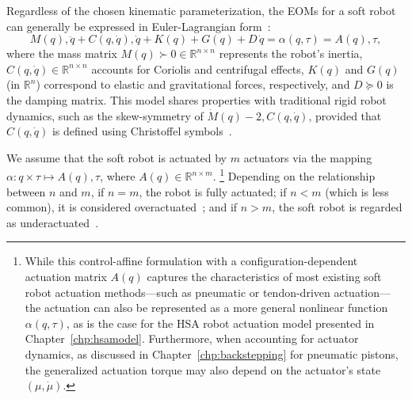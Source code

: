 Regardless of the chosen kinematic parameterization, the \glspl{EOM} for a soft robot can generally be expressed in Euler-Lagrangian form~\citep{della2023model}:
\begin{equation}\label{eq:background:dynamics:eom}
M(q) , \ddot{q} + C(q, \dot{q}) , \dot{q} + K(q) + G(q) + D \, \dot{q} = \alpha(q,\tau) = A(q) , \tau,
\end{equation}
where the mass matrix $M(q) \succ 0 \in \mathbb{R}^{n \times n}$ represents the robot’s inertia, $C(q,\dot{q}) \in \mathbb{R}^{n \times n}$ accounts for Coriolis and centrifugal effects, $K(q)$ and $G(q)$ (in $\mathbb{R}^{n}$) correspond to elastic and gravitational forces, respectively, and $D \succeq 0$ is the damping matrix. This model shares properties with traditional rigid robot dynamics, such as the skew-symmetry of $\dot{M}(q) - 2 , C(q,\dot{q})$, provided that $C(q,\dot{q})$ is defined using Christoffel symbols~\citep{della2020model}.

We assume that the soft robot is actuated by $m$ actuators via the mapping $\alpha: q \times \tau \mapsto A(q) , \tau$, where $A(q) \in \mathbb{R}^{n \times m}$. \footnote{While this control-affine formulation with a configuration-dependent actuation matrix $A(q)$ captures the characteristics of most existing soft robot actuation methods—such as pneumatic or tendon-driven actuation—the actuation can also be represented as a more general nonlinear function $\alpha(q,\tau)$, as is the case for the \gls{HSA} robot actuation model presented in Chapter~\ref{chp:hsamodel}. Furthermore, when accounting for actuator dynamics, as discussed in Chapter~\ref{chp:backstepping} for pneumatic pistons, the generalized actuation torque may also depend on the actuator’s state $(\mu,\dot{\mu})$.} Depending on the relationship between $n$ and $m$, if $n=m$, the robot is fully actuated; if $n < m$ (which is less common), it is considered overactuated~\citep{pustina2024input}; and if $n > m$, the soft robot is regarded as underactuated~\citep{pustina2025analysis}.

